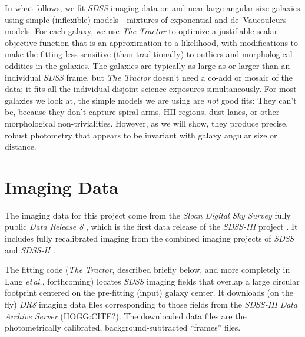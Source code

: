 \documentclass[12pt,preprint,pdftex]{aastex}
\newcommand{\project}[1]{\textsl{#1}}
\newcommand{\sectionname}{Section}
\newcommand{\sectionnames}{\sectionname s}
\newcommand{\foreign}[1]{\emph{#1}}
\newcommand{\etal}{\foreign{et\,al.}}
\begin{document}
In what follows, we fit \project{SDSS} imaging
data on and near large angular-size galaxies using simple (inflexible)
models---mixtures of exponential and de~Vaucouleurs models.  For each
galaxy, we use \project{The Tractor} to
optimize a justifiable scalar objective function that is an
approximation to a likelihood, with modifications to make the fitting
less sensitive (than traditionally) to outliers and morphological
oddities in the galaxies.  The galaxies are typically as large as or
larger than an individual \project{SDSS} frame, but \project{The
  Tractor} doesn't need a co-add or mosaic of the data; it fits all
the individual disjoint science exposures simultaneously.  For most
galaxies we look at, the simple models we are using are \emph{not}
good fits: They can't be, because they don't capture spiral arms, HII
regions, dust lanes, or other morphological non-trivialities.
However, as we will show, they produce precise, robust photometry that
appears to be invariant with galaxy angular size or distance.


\section{Imaging Data}\label{sec:data}
The imaging data for this project come from the \project{Sloan Digital
  Sky Survey} fully public \project{Data Release 8} \citep{dr8}, which is
the first data release of the \project{SDSS-III} project \citep{sdssiii}.  It
includes fully recalibrated imaging \citep{padmanabhan} from the
combined imaging projects of \project{SDSS} \citep{york}  and
\project{SDSS-II} \citep{sdssii}.

The fitting code (\project{The Tractor}, described briefly below, and
more completely in Lang \etal, forthcoming) locates \project{SDSS}
imaging fields that overlap a large circular footprint centered on the
pre-fitting (input) galaxy center.  It downloads (on the fly)
\project{DR8} imaging data files corresponding to those fields from
the \project{SDSS-III} \project{Data Archive Server} (HOGG:CITE?).  The
downloaded data files are the photometrically calibrated,
background-subtracted ``frames'' files.
\end{document}

